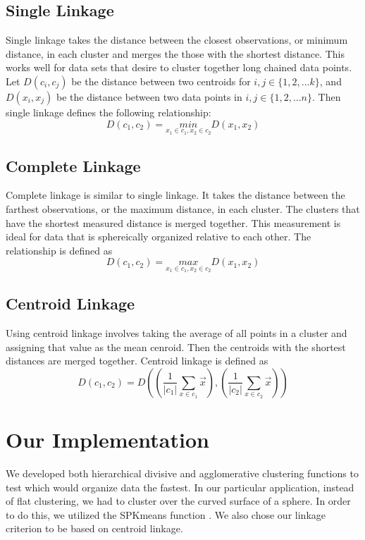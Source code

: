 \documentclass[../tech_report_1.tex]{subfiles}
\begin{document}
\subsection*{Single Linkage}

Single linkage takes the distance between the closest observations,
or minimum distance, in each cluster and merges the those with the
shortest distance. This works well for data sets that desire to cluster
together long chained data points. Let $D(c_i,c_j)$ be the distance between two centroids for $i,j \in \{1, 2, ... k\}$, and $D(x_i, x_j)$ be the distance between two data points in $i, j \in \{ 1, 2, ... n \}$. Then single linkage defines the following relationship:
\[
D(c_{1},c_{2})=\underset{x_{1}\in c_{1},x_{2}\in c_{2}}{min}D(x_{1},x_{2})
\]



\subsection*{Complete Linkage}

Complete linkage is similar to single linkage. It takes the distance
between the farthest observations, or the maximum distance, in each
cluster. The clusters that have the shortest measured distance is
merged together. This measurement is ideal for data that is sphereically
organized relative to each other. The relationship is defined as
\[
D(c_{1},c_{2})=\underset{x_{1}\in c_{1},x_{2}\in c_{2}}{max}D(x_{1},x_{2})
\]



\subsection*{Centroid Linkage}

Using centroid linkage involves taking the average of all points in
a cluster and assigning that value as the mean cenroid. Then
the centroids with the shortest distances are merged together.
Centroid linkage is defined as
\[
D(c_{1},c_{2})=D((\frac{1}{|c_{1}|}\sum_{x\in c_{1}}\overset{\rightarrow}{x}),(\frac{1}{|c_{2}|}\sum_{x\in c_{2}}\overset{\rightarrow}{x}))
\]



\section*{Our Implementation}

We developed both hierarchical divisive and agglomerative clustering
functions to test which would organize data the fastest. In our particular
application, instead of flat clustering, we had to cluster over the
curved surface of a sphere. In order to do this, we utilized the SPKmeans
function \cite{nguyen_spherical_clustering}. We also chose our linkage criterion
to be based on centroid linkage.
\end{document}
